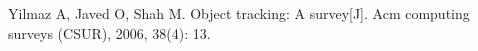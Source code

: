 \begin{thebibliography}

Yilmaz A, Javed O, Shah M. Object tracking: A survey[J]. Acm computing surveys (CSUR), 2006, 38(4): 13.

\end{thebibliography}
